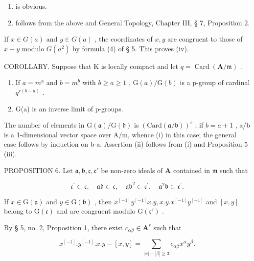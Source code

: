 \begin{enumerate}
\def\labelenumi{(\roman{enumi})}
\setcounter{enumi}{1}
\item
  is obvious.
\item
  follows from the above and General Topology, Chapter III, § 7, Proposition 2.
\end{enumerate}

If \(x \in G(a)\) and \(y \in G(a)\) , the coordinates of \(x, y\) are congruent to those of \(x + y\) modulo \(G(a^2)\) by formula (4) of § 5. This proves (iv).

COROLLARY. Suppose that K is locally compact and let \(q = \operatorname{Card}(\mathbf{A} / \mathfrak{m})\) .

\begin{enumerate}
\def\labelenumi{(\roman{enumi})}
\item
  If \(a = m^{a}\) and \(b = m^{b}\) with \(b \geqslant a \geqslant 1\) , \(\mathrm{G}(a)/\mathrm{G}(b)\) is a p-group of cardinal \(q^{r(b-a)}\) .
\item
  G(a) is an inverse limit of p-groups.
\end{enumerate}

The number of elements in \(\mathrm{G}(\mathfrak{a})/\mathrm{G}(\mathfrak{b})\) is \((\mathrm{Card}(\mathfrak{a}/\mathfrak{b}))^{r}\) ; if \(b=a+1\) , a/b is a 1-dimensional vector space over A/m, whence (i) in this case; the general case follows by induction on b-a. Assertion (ii) follows from (i) and Proposition 5 (iii).

PROPOSITION 6. Let \(\mathfrak{a}, \mathfrak{b}, \mathfrak{c}, \mathfrak{c}'\) be non-zero ideals of \(\mathbf{A}\) contained in \(\mathfrak{m}\) such that

\[
\mathfrak {c} ^ {\prime} \subset \mathfrak {c}, \quad \mathfrak {a b} \subset \mathfrak {c}, \quad \mathfrak {a b} ^ {2} \subset \mathfrak {c} ^ {\prime}, \quad \mathfrak {a} ^ {2} \mathfrak {b} \subset \mathfrak {c} ^ {\prime}.
\]

If \(x \in \mathrm{G}(\mathfrak{a})\) and \(y \in \mathrm{G}(\mathfrak{b})\) , then \(x^{[-1]}y^{[-1]}x.y, x.y.x^{[-1]}y^{[-1]}\) and \([x,y]\) belong to \(\mathrm{G}(\mathfrak{c})\) and are congruent modulo \(\mathrm{G}(\mathfrak{c}')\) .

By § 5, no. 2, Proposition 1, there exist \(c_{\alpha \beta} \in \mathbf{A}^r\) such that

\[
x ^ {[ - 1 ]}. y ^ {[ - 1 ]}. x. y - [ x, y ] = \sum_ {| \alpha | + | \beta | \geqslant 3} c _ {\alpha \beta} x ^ {\alpha} y ^ {\beta}.
\]

